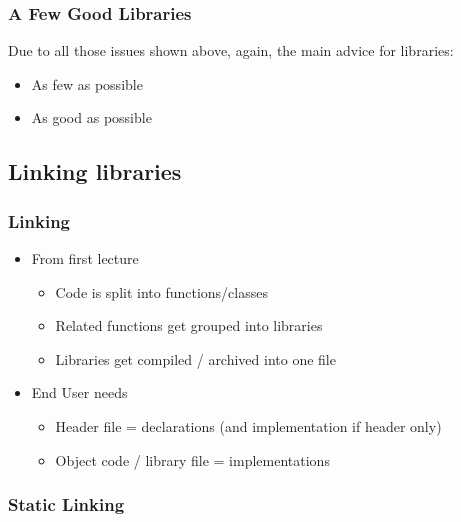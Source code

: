 \subsubsection{A Few Good Libraries}\label{a-few-good-libraries}

Due to all those issues shown above, again, the main advice for
libraries:

\begin{itemize}
\itemsep1pt\parskip0pt
\item
  As few as possible
\item
  As good as possible
\end{itemize}

\subsection{Linking libraries}\label{linking-libraries}

\subsubsection{Linking}\label{linking}

\begin{itemize}
\itemsep1pt\parskip0pt
\item
  From first lecture

  \begin{itemize}
  \itemsep1pt\parskip0pt
  \item
    Code is split into functions/classes
  \item
    Related functions get grouped into libraries
  \item
    Libraries get compiled / archived into one file
  \end{itemize}
\item
  End User needs

  \begin{itemize}
  \itemsep1pt\parskip0pt
  \item
    Header file = declarations (and implementation if header only)
  \item
    Object code / library file = implementations
  \end{itemize}
\end{itemize}

\subsubsection{Static Linking}\label{static-linking}

